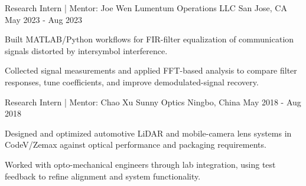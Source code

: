 
\begin{cventries}

  \cventry
    {Research Intern | Mentor: Joe Wen}
    {Lumentum Operations LLC}
    {San Jose, CA}
    {May 2023 - Aug 2023}
    {
      \begin{cvitems}
        \item {Built MATLAB/Python workflows for FIR-filter equalization of communication signals distorted by intersymbol interference.}
        \item {Collected signal measurements and applied FFT-based analysis to compare filter responses, tune coefficients, and improve demodulated-signal recovery.}
      \end{cvitems}
    }

  \cventry
    {Research Intern | Mentor: Chao Xu}
    {Sunny Optics}
    {Ningbo, China}
    {May 2018 - Aug 2018}
    {
      \begin{cvitems}
        \item {Designed and optimized automotive LiDAR and mobile-camera lens systems in CodeV/Zemax against optical performance and packaging requirements.}
        \item {Worked with opto-mechanical engineers through lab integration, using test feedback to refine alignment and system functionality.}
      \end{cvitems}
    }

\end{cventries}
